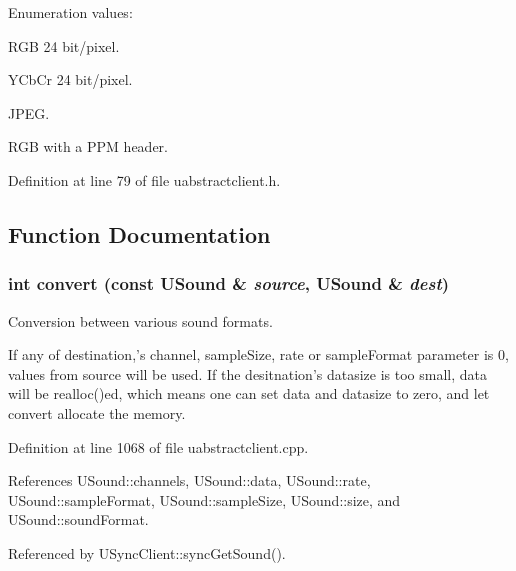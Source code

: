 \begin{Desc}
\item[Enumeration values: ]\par
\begin{description}
\item[{\em 
IMAGE\_\-RGB\label{uabstractclient_8h_a50a25}
}]RGB 24 bit/pixel. \item[{\em 
IMAGE\_\-YCb\-Cr\label{uabstractclient_8h_a50a26}
}]YCb\-Cr 24 bit/pixel. \item[{\em 
IMAGE\_\-JPEG\label{uabstractclient_8h_a50a27}
}]JPEG. \item[{\em 
IMAGE\_\-PPM\label{uabstractclient_8h_a50a28}
}]RGB with a PPM header. \end{description}
\end{Desc}



Definition at line 79 of file uabstractclient.h.

\subsection{Function Documentation}
\subsubsection{\setlength{\rightskip}{0pt plus 5cm}int convert (const {\bf USound} \& {\em source}, {\bf USound} \& {\em dest})}\label{uabstractclient_8h_a39}


Conversion between various sound formats. 

If any of destination,'s channel, sample\-Size, rate or sample\-Format parameter is 0, values from source will be used. If the desitnation's datasize is too small, data will be realloc()ed, which means one can set data and datasize to zero, and let convert allocate the memory. 

Definition at line 1068 of file uabstractclient.cpp.

References USound::channels, USound::data, USound::rate, USound::sample\-Format, USound::sample\-Size, USound::size, and USound::sound\-Format.

Referenced by USync\-Client::sync\-Get\-Sound().